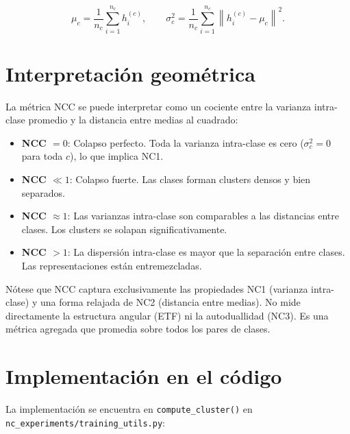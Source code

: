 \documentclass[12pt,a4paper]{report}
\newcommand{\norm}[1]{\left\lVert#1\right\rVert}
\begin{document}
\begin{equation}
    \mu_c = \frac{1}{n_c} \sum_{i=1}^{n_c} h_i^{(c)}, \qquad
    \sigma_c^2 = \frac{1}{n_c} \sum_{i=1}^{n_c} \norm{h_i^{(c)} - \mu_c}^2.
\end{equation}

\section{Interpretación geométrica}

La métrica NCC se puede interpretar como un cociente entre la varianza intra-clase promedio y la distancia entre medias al cuadrado:

\begin{itemize}
    \item \textbf{NCC $= 0$}: Colapso perfecto. Toda la varianza intra-clase es cero ($\sigma_c^2 = 0$ para toda $c$), lo que implica NC1.
    \item \textbf{NCC $\ll 1$}: Colapso fuerte. Las clases forman clusters densos y bien separados.
    \item \textbf{NCC $\approx 1$}: Las varianzas intra-clase son comparables a las distancias entre clases. Los clusters se solapan significativamente.
    \item \textbf{NCC $> 1$}: La dispersión intra-clase es mayor que la separación entre clases. Las representaciones están entremezcladas.
\end{itemize}

Nótese que NCC captura exclusivamente las propiedades NC1 (varianza intra-clase) y una forma relajada de NC2 (distancia entre medias). No mide directamente la estructura angular (ETF) ni la autoduallidad (NC3). Es una métrica agregada que promedia sobre todos los pares de clases.

\section{Implementación en el código}

La implementación se encuentra en \texttt{compute\_cluster()} en \texttt{nc\_experiments/training\_utils.py}:
\end{document}
